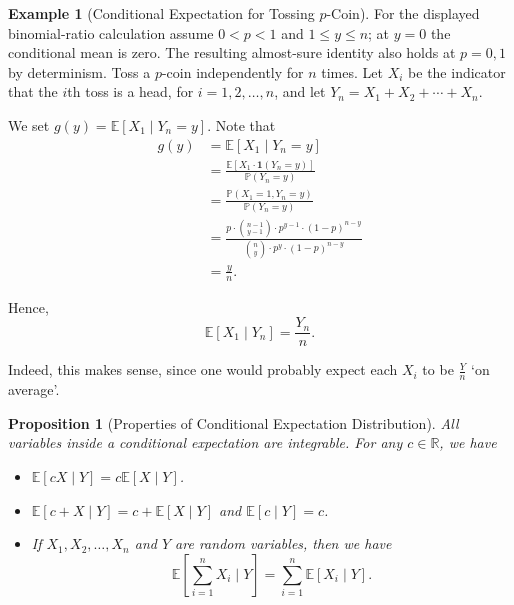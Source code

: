 \documentclass[11pt]{article}
\numberwithin{equation}{section}
\newtheorem{proposition}[theorem]{Proposition}
\theoremstyle{definition}
\newtheorem{example}[theorem]{Example}
\theoremstyle{remark}
\newcommand{\pqty}[1]{\left(#1\right)}
\newcommand{\bqty}[1]{\left[#1\right]}
\newcommand{\RR}{\mathbb R}
\newcommand{\indicator}{\mathbf 1}
\newcommand{\Prob}{\mathbb P}
\newcommand{\Expt}{\mathbb E}
\newcommand{\Conditional}[2]{#1\mid #2}
\begin{document}
\begin{example}[Conditional Expectation for Tossing \(p\)-Coin]\label{probability-example-027}
    \label{probability-ex:conditional-expectatio-tossing-p-coin}%
For the displayed binomial-ratio calculation assume \(0<p<1\) and \(1\le y\le n\); at \(y=0\) the conditional mean is zero. The resulting almost-sure identity also holds at \(p=0,1\) by determinism.
    Toss a \(p\)-coin independently for \(n\) times. Let \(X_i\) be the indicator that the \(i\)th toss is a head, for \(i = 1, 2, \ldots, n\), and let \(Y_n = X_1 + X_2 + \cdots + X_n\).

    We set \(g\pqty{y} = \Expt\bqty{\Conditional{X_1}{Y_n = y}}\). Note that
    \begin{align*}
        g\pqty{y} &= \Expt\bqty{\Conditional{X_1}{Y_n = y}} \\
        &= \frac{\Expt\bqty{X_1 \cdot \indicator\pqty{Y_n = y}}}{\Prob\pqty{Y_n = y}} \\
        &= \frac{\Prob\pqty{X_1 = 1, Y_n = y}}{\Prob\pqty{Y_n = y}} \\
        &= \frac{p \cdot \binom{n - 1}{y - 1} \cdot p^{y - 1} \cdot \pqty{1 - p}^{n - y}}{\binom{n}{y} \cdot p^y \cdot \pqty{1 - p}^{n - y}} \\
        &= \frac{y}{n}.
    \end{align*}

    Hence,
    \[
        \Expt\bqty{\Conditional{X_1}{Y_n}} = \frac{Y_n}{n}.
    \]

    Indeed, this makes sense, since one would probably expect each \(X_i\) to be \(\frac{Y}{n}\) `on average'.
\end{example}

\begin{proposition}[Properties of Conditional Expectation Distribution]\label{probability-proposition-018}
    \label{probability-prop:conditional-expectation-distribution-property}
All variables inside a conditional expectation are integrable.
%
    For any \(c \in \RR\), we have
    \begin{itemize}
        \item \(\Expt\bqty{\Conditional{cX}{Y}} = c \Expt\bqty{\Conditional{X}{Y}}\).
        \item \(\Expt\bqty{\Conditional{c + X}{Y}} = c + \Expt\bqty{\Conditional{X}{Y}}\) and \(\Expt\bqty{\Conditional{c}{Y}} = c\).
        \item If \(X_1, X_2, \ldots, X_n\) and \(Y\) are random variables, then we have
        \[
            \Expt\bqty{\Conditional{\sum_{i = 1}^{n} X_i}{Y}} = \sum_{i = 1}^{n} \Expt\bqty{\Conditional{X_i}{Y}}.
        \]
    \end{itemize}
\end{proposition}
\end{document}
